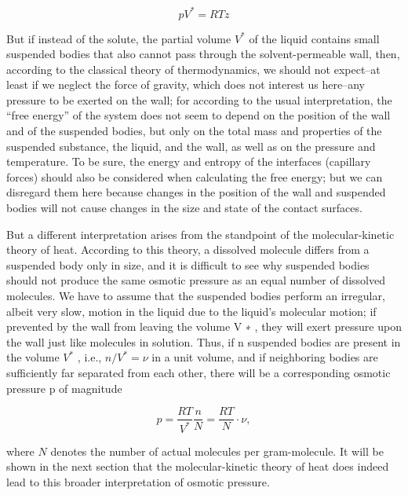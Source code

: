 \documentclass{article}
\begin{document}
\[pV^{*}=RTz\]

But if instead of the solute, the partial volume $V^{*}$ of the liquid contains small suspended bodies
that also cannot pass through the solvent-permeable wall, then, according to the classical theory
of thermodynamics, we should not expect–at least if we neglect the force of gravity, which does not
interest us here–any pressure to be exerted on the wall; for according to the usual interpretation,
the “free energy” of the system does not seem to depend on the position of the wall and of the
suspended bodies, but only on the total mass and properties of the suspended substance, the liquid,
and the wall, as well as on the pressure and temperature. To be sure, the energy and entropy of
the interfaces (capillary forces) should also be considered when calculating the free energy; but we
can disregard them here because changes in the position of the wall and suspended bodies will not
cause changes in the size and state of the contact surfaces.

But a different interpretation arises from the standpoint of the molecular-kinetic theory of heat.
According to this theory, a dissolved molecule differs from a suspended body only in size, and it
is difficult to see why suspended bodies should not produce the same osmotic pressure as an equal
number of dissolved molecules. We have to assume that the suspended bodies perform an irregular,
albeit very slow, motion in the liquid due to the liquid’s molecular motion; if prevented by the wall
from leaving the volume V ∗ , they will exert pressure upon the wall just like molecules in solution.
Thus, if n suspended bodies are present in the volume $V^{*}$ , i.e., $n/V^{*}=\nu$ in a unit volume, and
if neighboring bodies are sufficiently far separated from each other, there will be a corresponding
osmotic pressure p of magnitude

\[p=\frac{RT}{V^{*}}\frac{n}{N}=\frac{RT}{N}\cdot\nu,\]

where $N$ denotes the number of actual molecules per gram-molecule. It will be shown in the next
section that the molecular-kinetic theory of heat does indeed lead to this broader interpretation of
osmotic pressure.

\end{document}
